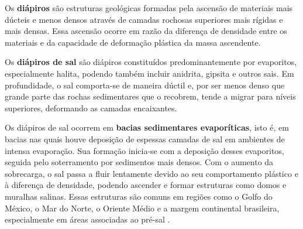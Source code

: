 \begin{definicao}
Os \textbf{diápiros} são estruturas geológicas formadas pela ascensão de materiais mais dúcteis e menos densos através de camadas rochosas superiores mais rígidas e mais densas. Essa ascensão ocorre em razão da diferença de densidade entre os materiais e da capacidade de deformação plástica da massa ascendente.

Os \textbf{diápiros de sal} são diápiros constituídos predominantemente por evaporitos, especialmente halita, podendo também incluir anidrita, gipsita e outros sais. Em profundidade, o sal comporta-se de maneira dúctil e, por ser menos denso que grande parte das rochas sedimentares que o recobrem, tende a migrar para níveis superiores, deformando as camadas encaixantes.

Os diápiros de sal ocorrem em \textbf{bacias sedimentares evaporíticas}, isto é, em bacias nas quais houve deposição de espessas camadas de sal em ambientes de intensa evaporação. Sua formação inicia-se com a deposição desses evaporitos, seguida pelo soterramento por sedimentos mais densos. Com o aumento da sobrecarga, o sal passa a fluir lentamente devido ao seu comportamento plástico e à diferença de densidade, podendo ascender e formar estruturas como domos e muralhas salinas. Essas estruturas são comuns em regiões como o Golfo do México, o Mar do Norte, o Oriente Médio e a margem continental brasileira, especialmente em áreas associadas ao pré-sal \parencite{jacksonhudec2017}.

\end{definicao}
